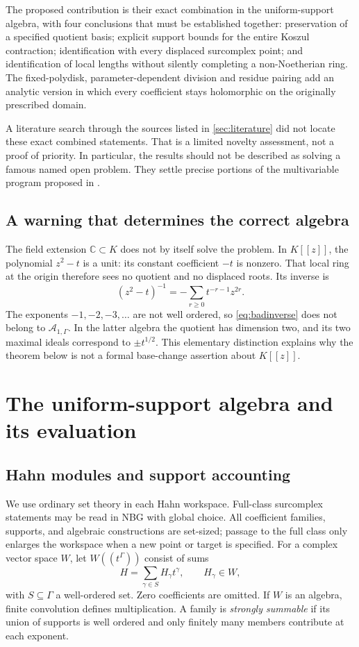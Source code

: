 \documentclass[11pt,letterpaper]{article}
\theoremstyle{definition}
\theoremstyle{remark}
\newcommand{\C}{\mathbb C}
\newcommand{\A}{\mathscr A}
\numberwithin{equation}{section}
\begin{document}
The proposed contribution is their exact combination in the uniform-support algebra, with four conclusions that must be established together: preservation of a specified quotient basis; explicit support bounds for the entire Koszul contraction; identification with every displaced surcomplex point; and identification of local lengths without silently completing a non-Noetherian ring. The fixed-polydisk, parameter-dependent division and residue pairing add an analytic version in which every coefficient stays holomorphic on the originally prescribed domain.

A literature search through the sources listed in \cref{sec:literature} did not locate these exact combined statements. That is a limited novelty assessment, not a proof of priority. In particular, the results should not be described as solving a famous named open problem. They settle precise portions of the multivariable program proposed in \cite{Prior}.

\subsection{A warning that determines the correct algebra}
The field extension $\C\subset K$ does not by itself solve the problem. In $K[[z]]$, the polynomial $z^2-t$ is a unit: its constant coefficient $-t$ is nonzero. That local ring at the origin therefore sees no quotient and no displaced roots. Its inverse is
\begin{equation}\label{eq:badinverse}
 (z^2-t)^{-1}=-\sum_{r\geq0}t^{-r-1}z^{2r}.
\end{equation}
The exponents $-1,-2,-3,\ldots$ are not well ordered, so \eqref{eq:badinverse} does not belong to $\A_{1,\Gamma}$. In the latter algebra the quotient has dimension two, and its two maximal ideals correspond to $\pm t^{1/2}$. This elementary distinction explains why the theorem below is not a formal base-change assertion about $K[[z]]$.

\section{The uniform-support algebra and its evaluation}\label{sec:algebra}
\subsection{Hahn modules and support accounting}
We use ordinary set theory in each Hahn workspace. Full-class surcomplex statements may be read in NBG with global choice. All coefficient families, supports, and algebraic constructions are set-sized; passage to the full class only enlarges the workspace when a new point or target is specified.
For a complex vector space $W$, let $W((t^\Gamma))$ consist of sums
\[
 H=\sum_{\gamma\in S}H_\gamma t^\gamma,
 \qquad H_\gamma\in W,
\]
with $S\subseteq\Gamma$ a well-ordered set. Zero coefficients are omitted. If $W$ is an algebra, finite convolution defines multiplication. A family is \emph{strongly summable} if its union of supports is well ordered and only finitely many members contribute at each exponent.
\end{document}
